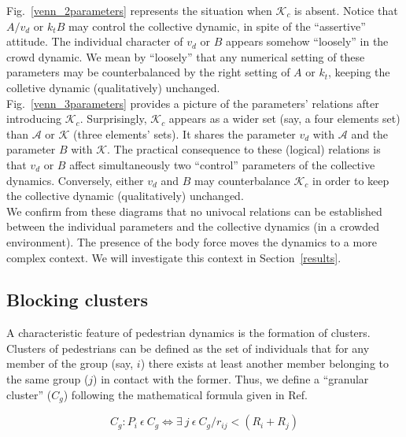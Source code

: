 \documentclass[preprint,12pt]{elsarticle}
\begin{document}
Fig.~\ref{venn_2parameters} represents the situation when $\mathcal{K}_c$ is 
absent. Notice that $A/v_d$ or $k_t B$ may control the collective 
dynamic, in spite of the ``assertive'' attitude. The individual character of 
$v_d$ or $B$ appears somehow ``loosely'' in the crowd dynamic. We mean by 
``loosely'' that any numerical setting of these parameters may be 
counterbalanced by the right setting of $A$ or $k_t$, keeping the 
colletive dynamic (qualitatively) unchanged.  \\

Fig.~\ref{venn_3parameters} provides a picture of the parameters' relations 
after introducing $\mathcal{K}_c$. Surprisingly, $\mathcal{K}_c$ appears as a
wider set (say, a four elements set) than $\mathcal{A}$ or $\mathcal{K}$ (three 
elements' sets). It shares the parameter $v_d$ with $\mathcal{A}$ and the 
parameter $B$ with $\mathcal{K}$. The practical consequence to these (logical)
relations is that $v_d$ or $B$ affect simultaneously two ``control'' parameters 
of the collective dynamics. Conversely, either $v_d$ and $B$ may counterbalance 
$\mathcal{K}_c$ in order to keep the collective dynamic (qualitatively) 
unchanged.  \\

We confirm from these diagrams that no univocal relations can be established 
between the individual parameters and the collective dynamics (in a crowded 
environment). The presence of the body force moves the dynamics to a more 
complex context. We will investigate this context in Section~\ref{results}. \\


\subsection{\label{blocking_clusters} Blocking clusters}

A characteristic feature of pedestrian dynamics is the formation of clusters. Clusters of pedestrians can 
be defined as the set of individuals that for any member of the group (say, $i$) there exists at least another member belonging to the same group ($j$) in contact with the former. Thus, we define a ``granular cluster'' ($C_g$) following the mathematical formula given in Ref.~\cite{dorso_2005}

\begin{equation}
C_g:P_i~\epsilon~ C_g \Leftrightarrow \exists~ j~\epsilon~C_g / r_{ij} < (R_i+R_j) \label{ec-cluster}
\end{equation}
\end{document}
